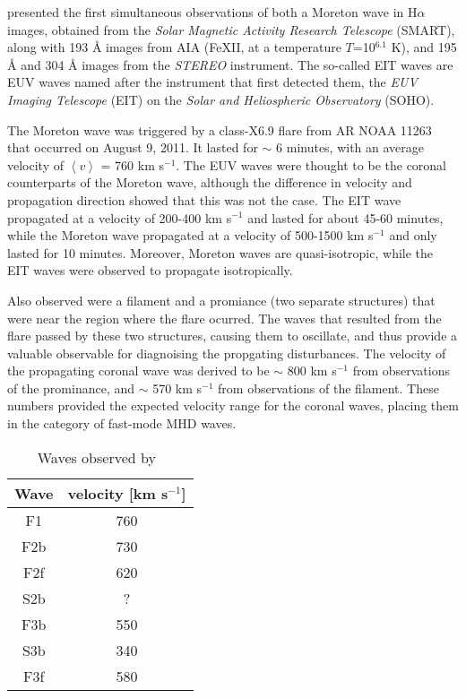 \documentclass[preprint2]{aastex}
\begin{document}
\cite{pfw_1} presented the first simultaneous observations of both
a Moreton wave in H$\alpha$ images, obtained from the
\emph{Solar Magnetic Activity Research Telescope} (SMART),
along with 193 \AA{} images from AIA
(Fe{\footnotesize XII}, at a temperature $T$=10$^{6.1}$ K),
and 195 \AA{} and 304 \AA{} images from the
\emph{STEREO} instrument.
The so-called {EIT} waves are EUV waves
named after the instrument that first detected them,
the \emph{EUV Imaging Telescope} (EIT) on the
\emph{Solar and Heliospheric Observatory} (SOHO).

The Moreton wave was triggered by
a class-X6.9 flare from AR NOAA 11263 that occurred on August 9, 2011.
It lasted for $\sim$ 6 minutes, with an average
velocity of $\left\langle v \right\rangle$ = 760 km s$^{-1}$.
The EUV waves were thought to be the coronal counterparts of the
Moreton wave, although the difference in velocity and propagation
direction showed that this was not the case.
The EIT wave propagated at a velocity of 200-400 km s$^{-1}$ and lasted for
about 45-60 minutes, while the Moreton wave propagated at a velocity
of 500-1500 km s$^{-1}$ and only lasted for 10 minutes.
Moreover, Moreton waves are quasi-isotropic, while the EIT waves were observed to
propagate isotropically.

Also observed were a filament and a promiance (two separate structures)
that were near the region where the flare ocurred. The waves that resulted
from the flare passed by these two structures, causing them to oscillate,
and thus provide a valuable observable for diagnoising the propgating
disturbances.
The velocity of the propagating coronal wave was derived to be
$\sim$ 800 km s$^{-1}$ from observations of the prominance, and
$\sim$ 570 km s$^{-1}$ from observations of the filament.
These numbers provided the expected velocity range for the coronal
waves, placing them in the category of fast-mode MHD waves.

\begin{table}[h]
    \centering
    \begin{tabular}{c c}
         \hline\hline
         Wave & velocity [km s$^{-1}$]\\
         \hline
         F1 & 760\\
         F2b & 730\\
         F2f & 620\\
         S2b & ?\\
         F3b & 550\\
         S3b & 340\\
         F3f & 580\\
         \hline
    \end{tabular}\\
    \caption{Waves observed by~\cite{pfw_1}}
    \label{table:lines}
\end{table}
\end{document}
